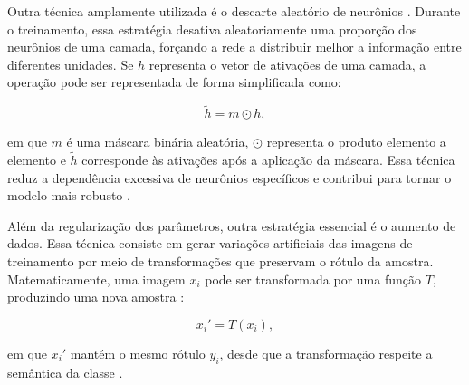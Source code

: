 \documentclass[
    12pt,
    openright,
    oneside,
    a4paper,
    english,
    brazil
]{abntex2}
\begin{document}
Outra técnica amplamente utilizada é o descarte aleatório de neurônios \cite{srivastava2014dropout}. Durante o treinamento, essa estratégia desativa aleatoriamente uma proporção dos neurônios de uma camada, forçando a rede a distribuir melhor a informação entre diferentes unidades. Se \(h\) representa o vetor de ativações de uma camada, a operação pode ser representada de forma simplificada como:

\begin{equation}
\label{eq:dropout}
\tilde{h} = m \odot h,
\end{equation}

em que \(m\) é uma máscara binária aleatória, \(\odot\) representa o produto elemento a elemento e \(\tilde{h}\) corresponde às ativações após a aplicação da máscara. Essa técnica reduz a dependência excessiva de neurônios específicos e contribui para tornar o modelo mais robusto \cite{srivastava2014dropout}.

Além da regularização dos parâmetros, outra estratégia essencial é o aumento de dados. Essa técnica consiste em gerar variações artificiais das imagens de treinamento por meio de transformações que preservam o rótulo da amostra. Matematicamente, uma imagem \(x_i\) pode ser transformada por uma função \(T\), produzindo uma nova amostra \cite{goodfellow2016deep,krizhevsky2012alexnet}:

\begin{equation}
\label{eq:aumento_dados}
x_i' = T(x_i),
\end{equation}

em que \(x_i'\) mantém o mesmo rótulo \(y_i\), desde que a transformação respeite a semântica da classe \cite{goodfellow2016deep,krizhevsky2012alexnet}.
\end{document}
